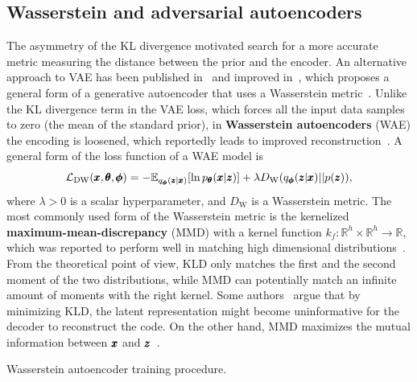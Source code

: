 \subsection{Wasserstein and adversarial autoencoders} \label{sec:wae}
The asymmetry of the KL divergence motivated search for a more accurate metric measuring the distance between the prior and the encoder. An alternative approach to VAE has been published in~\cite{mescheder2017adversarial} and improved in~\cite{tolstikhin2017wasserstein}, which proposes a general form of a generative autoencoder that uses a Wasserstein metric~\cite{givens1984class}. Unlike the KL divergence term in the VAE loss, which forces all the input data samples to zero (the mean of the standard prior), in \textbf{Wasserstein autoencoders} (WAE) the encoding is loosened, which reportedly leads to improved reconstruction~\cite{tolstikhin2017wasserstein}. A general form of the loss function of a WAE model is
\begin{equation} \label{eq:general_wae_loss}
    \mathcal{L}_{\text{DW}} (\vc{x}, \vc{\theta}, \vc{\phi}) = - \mathbb{E}_{q_{\vc{\phi}}(\vc{z}|\vc{x})} \left[ \ln p_{\vc{\theta}}(\vc{x}|\vc{z}) \right] + \lambda D_{\text{W}} \left( q_{\vc{\phi}}(\vc{z}|\vc{x}) || p(\vc{z}) \right),
\end{equation}
where $\lambda >0$  is a scalar hyperparameter, and $D_{\text{W}}$ is a Wasserstein metric. The most commonly used form of the Wasserstein metric is the kernelized \textbf{maximum-mean-discrepancy} (MMD) with a kernel function $k_f:\mathbb{R}^h \times \mathbb{R}^h \rightarrow \mathbb{R}$, which was reported to perform well in matching high dimensional distributions~\cite{zhao2017infovae}. From the theoretical point of view, KLD only matches the first and the second moment of the two distributions, while MMD can potentially match an infinite amount of moments with the right kernel. Some authors~\cite{tolstikhin2017wasserstein} argue that by minimizing KLD, the latent representation might become uninformative for the decoder to reconstruct the code. On the other hand, MMD maximizes the mutual information between $\pmb{{x}}$  and $\pmb{{z}}$~\cite{zhao2017infovae}.

\begin{algorithm}

\caption{Wasserstein autoencoder training procedure.}
\label{alg:infovae}
\end{algorithm}

